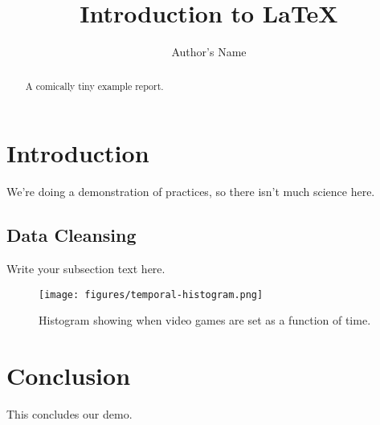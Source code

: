 \documentclass{article}
\begin{document}
\title{Introduction to \LaTeX{}}
\author{Author's Name}

\maketitle

\begin{abstract}
A comically tiny example report.
\end{abstract}

\section{Introduction}

We're doing a demonstration of practices, so there isn't much science here.


\subsection{Data Cleansing}
Write your subsection text here.

\begin{figure}
    \centering
    \texttt{[image: figures/temporal-histogram.png]}
    \caption{Histogram showing when video games are set as a function of time.}
    \label{temphist}
\end{figure}

\section{Conclusion}
This concludes our demo.
\end{document}
